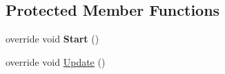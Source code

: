 \subsection*{Protected Member Functions}
\begin{DoxyCompactItemize}
\item 
\hypertarget{class_skyrates_1_1_client_1_1_entity_1_1_entity_ship_a1bef17a64f399068d9afe6ecfde1515e}{override void {\bfseries Start} ()}\label{class_skyrates_1_1_client_1_1_entity_1_1_entity_ship_a1bef17a64f399068d9afe6ecfde1515e}

\item 
\hypertarget{class_skyrates_1_1_client_1_1_entity_1_1_entity_ship_aacfa144bb75a4e3cf03c01f24becade2}{override void \hyperlink{class_skyrates_1_1_client_1_1_entity_1_1_entity_ship_aacfa144bb75a4e3cf03c01f24becade2}{Update} ()}\label{class_skyrates_1_1_client_1_1_entity_1_1_entity_ship_aacfa144bb75a4e3cf03c01f24becade2}


\end{DoxyCompactItemize}
